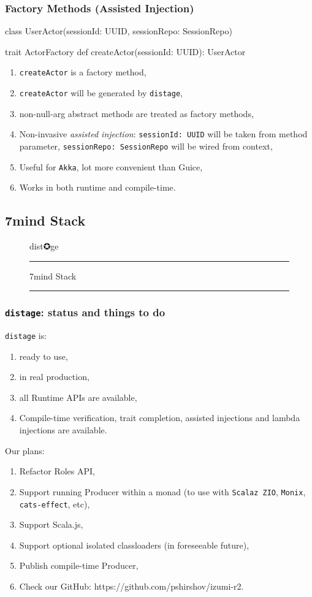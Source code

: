 \documentclass[usenames,dvipsnames]{beamer}
\newcommand{\distage}{\texttt{distage}\xspace}
\begin{document}
\begin{frame}[fragile]
\frametitle{Factory Methods (Assisted Injection)}
\begin{scalacode}
class UserActor(sessionId: UUID, sessionRepo: SessionRepo)

trait ActorFactory {
  def createActor(sessionId: UUID): UserActor
}
\end{scalacode}

\begin{enumerate}
\item \texttt{createActor} is a factory method,
\item \texttt{createActor} will be generated by \distage,
\item non-null-arg abstract methods are treated as factory methods,
\item Non-invasive \textit{assisted injection}: \texttt{sessionId: UUID} will be taken from method parameter, \texttt{sessionRepo: SessionRepo} will be wired from context,
\item Useful for \texttt{Akka}, lot more convenient than Guice,
\item Works in both runtime and compile-time.
\end{enumerate}
\end{frame}


\subsection{7mind Stack}
\begin{frame}
\begin{figure}
\Huge 
\color{RubineRed} dist✪ge
\noindent
\rule{\linewidth}{1mm}
\Large 7mind Stack
\rule{\linewidth}{1mm}
\end{figure}
\end{frame}

\begin{frame}
\frametitle{\distage: status and things to do}
\distage is:
\begin{enumerate}
\item ready to use,
\item in real production,
\item all Runtime APIs are available,
\item Compile-time verification, trait completion, assisted injections and lambda injections are available.
\end{enumerate}
\vspace{0.3cm}
Our plans:
\begin{enumerate}
\item Refactor Roles API,
\item Support running Producer within a monad (to use with \texttt{Scalaz ZIO}, \texttt{Monix}, \texttt{cats-effect}, etc),
\item Support Scala.js,
\item Support optional isolated classloaders (in foreseeable future),
\item Publish compile-time Producer,
\item Check our GitHub: https://github.com/pshirshov/izumi-r2.
\end{enumerate}
\end{frame}
\end{document}
